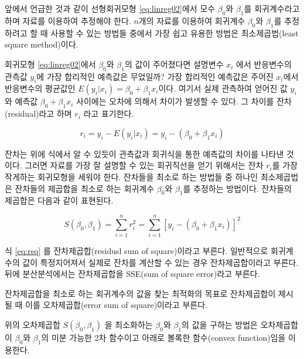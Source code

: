 \documentclass[
]{book}
\makeatletter
\newenvironment{kframe}{%
\medskip{}
\setlength{\fboxsep}{.8em}
 \def\at@end@of@kframe{}%
 \ifinner\ifhmode%
  \def\at@end@of@kframe{\end{minipage}}%
  \begin{minipage}{\columnwidth}%
 \fi\fi%
 \def\FrameCommand##1{\hskip\@totalleftmargin \hskip-\fboxsep
 \colorbox{shadecolor}{##1}\hskip-\fboxsep
     \hskip-\linewidth \hskip-\@totalleftmargin \hskip\columnwidth}%
 \MakeFramed {\advance\hsize-\width
   \@totalleftmargin\z@ \linewidth\hsize
   \@setminipage}}%
 {\par\unskip\endMakeFramed%
 \at@end@of@kframe}
\newenvironment{rmdblock}[1]
  {
  \begin{itemize}
  \renewcommand{\labelitemi}{
    \raisebox{-.7\height}[0pt][0pt]{
      {\setkeys{Gin}{width=3em,keepaspectratio}\texttt{[image: images/\#1]}}
    }
  }
  \setlength{\fboxsep}{1em}
  \begin{kframe}
  \item
  }
  {
  \end{kframe}
  \end{itemize}
  }
\newenvironment{rmdnote}
  {\begin{rmdblock}{note}}
  {\end{rmdblock}}
\theoremstyle{definition}
\theoremstyle{definition}
\theoremstyle{definition}
\theoremstyle{remark}
\makeatother
\begin{document}
앞에서 언급한 것과 같이 선형회귀모형 \eqref{eq:linreg02}에서 모수 \(\beta_0\)와 \(\beta_1\)를 회귀계수라고 하며 자료를 이용하여 추정해야 한다.
\(n\)개의 자료를 이용하여 회귀계수 \(\beta_0\)와 \(\beta_1\)를 추정하려고 할 때 사용할 수 있는 방법들 중에서 가장 쉽고 유용한 방법은 최소제곱법(least square method)이다.

회귀모형 \eqref{eq:linreg02}에서 \(\beta_0\)와 \(\beta_1\)의 값이 주어졌다면 설명변수 \(x_i\) 에서 반응변수의 관측값 \(y_i\)에 가장 합리적인 예측값은 무었일까?
가장 합리적인 예측값은 주어진 \(x_i\)에서 반응변수의 평균값인 \(E(y_i | x_i)=\beta_0 + \beta_1 x_i\)이다. 여기서 실제 관측하여 얻어진 값 \(y_i\)와 예측값 \(\beta_0 + \beta_1 x_i\) 사이에는 오차에 의해서 차이가 발생할 수 있다. 그 차이를 잔차(residual)라고 하며 \(r_i\) 라고 표기한다.

\[  r_i = y_i - E(y_i|x_i) = y_i - (  \beta_0 +  \beta_1 x_i) \]

잔차는 위에 식에서 알 수 있듯이 관측값과 회귀식을 통한 예측값의 차이를 나타낸 것이다. 그러면 자료를 가장 잘 설명할 수 있는 회귀직선을 얻기 위해서는 잔차 \(r_i\)를 가장 작게하는 회귀모형을 세워야 한다. 잔차들을 최소로 하는 방법들 중 하나인 최소제곱법은 잔차들의 제곱합을 최소로 하는 회귀계수 \(\beta_0\)와 \(\beta_1\)를 추정하는 방법이다. 잔차들의 제곱합은 다음과 같이 표현된다.

\begin{equation} 
 S(\beta_0 , \beta_1) = \sum^n_{i=1}r^2_i = \sum^n_{i=1}[y_i-(\beta_0 + \beta_1 x_i)]^2 
 \label{eq:rsq}
 \end{equation}

\begin{rmdnote}
식 \eqref{eq:rsq} 를 잔차제곱합(residusl sum of square)이라고 부른다. 일반적으로 회귀계수의 값이 특정지어져서 실제로 잔차를 계산할 수 있는 경우 잔차제곱합이라고 부른다. 뒤에 분산분석에서는 잔차제곱합을 SSE(sum of square error)라고 부른다.

잔차제곱합을 최소로 하는 회귀계수의 값을 찾는 최적화의 목표로 잔차제곱합이 제시될 때 이를 오차제곱합(error sum of square)이라고 부른다.
\end{rmdnote}

위의 오차제곱합 \(S(\beta_0 , \beta_1)\) 을 최소화하는 \(\beta_0\)와 \(\beta_1\)의 값을 구하는 방법은 오차제곱합이 \(\beta_0\)와 \(\beta_1\)의 미분 가능한 2차 함수이고 아래로 볼록한 함수(convex function)임을 이용한다.
\end{document}
